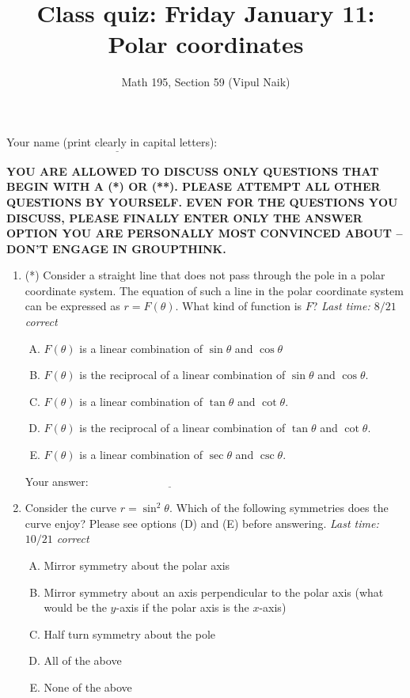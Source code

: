 \documentclass[10pt]{amsart}
\title{Class quiz: Friday January 11: Polar coordinates}
\author{Math 195, Section 59 (Vipul Naik)}
\begin{document}
\maketitle

Your name (print clearly in capital letters): $\underline{\qquad\qquad\qquad\qquad\qquad\qquad\qquad\qquad\qquad\qquad}$

\vspace{0.1in}

{\bf YOU ARE ALLOWED TO DISCUSS ONLY QUESTIONS THAT BEGIN WITH A (*)
  OR (**). PLEASE ATTEMPT ALL OTHER QUESTIONS BY YOURSELF. EVEN FOR THE QUESTIONS YOU DISCUSS, PLEASE FINALLY ENTER ONLY THE ANSWER OPTION YOU ARE PERSONALLY MOST CONVINCED ABOUT -- DON'T ENGAGE IN GROUPTHINK.}

\begin{enumerate}

\item (*) Consider a straight line that does not pass through the pole in
  a polar coordinate system. The equation of such a line in the polar
  coordinate system can be expressed as $r = F(\theta)$. What kind of
  function is $F$? {\em Last time: $8/21$ correct}

  \begin{enumerate}[(A)]

  \item $F(\theta)$ is a linear combination of $\sin \theta$ and $\cos \theta$
  \item $F(\theta)$ is the reciprocal of a linear combination of $\sin
    \theta$ and $\cos \theta$.
  \item $F(\theta)$ is a linear combination of $\tan \theta$ and $\cot
    \theta$.
  \item $F(\theta)$ is the reciprocal of a linear combination of $\tan
    \theta$ and $\cot \theta$.
  \item $F(\theta)$ is a linear combination of $\sec \theta$ and $\csc
    \theta$.
  \end{enumerate}

  \vspace{0.1in}
  Your answer: $\underline{\qquad\qquad\qquad\qquad\qquad\qquad\qquad}$
  \vspace{0.6in}

\item Consider the curve $r = \sin^2\theta$. Which of the following
  symmetries does the curve enjoy? Please see options (D) and (E)
  before answering. {\em Last time: $10/21$ correct}

  \begin{enumerate}[(A)]
  \item Mirror symmetry about the polar axis
  \item Mirror symmetry about an axis perpendicular to the polar axis
    (what would be the $y$-axis if the polar axis is the $x$-axis)
  \item Half turn symmetry about the pole
  \item All of the above
  \item None of the above
  \end{enumerate}


\end{enumerate}
\end{document}
